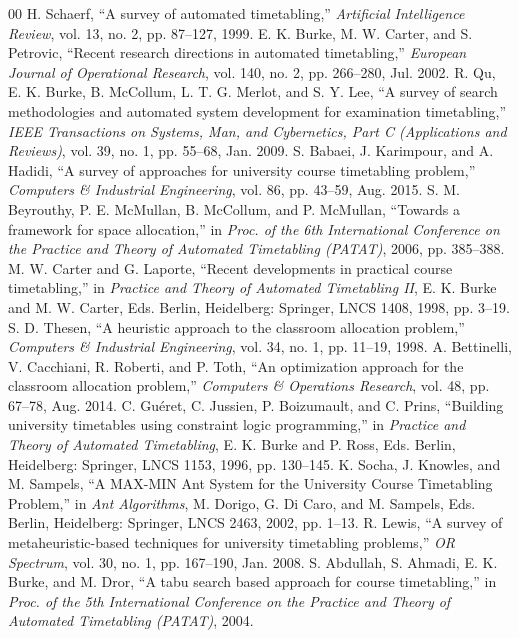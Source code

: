 \documentclass[conference]{IEEEtran}
\begin{document}
\begin{thebibliography}{00}
 H. Schaerf, ``A survey of automated timetabling,'' \textit{Artificial Intelligence Review}, vol. 13, no. 2, pp. 87--127, 1999.
 E. K. Burke, M. W. Carter, and S. Petrovic, ``Recent research directions in automated timetabling,'' \textit{European Journal of Operational Research}, vol. 140, no. 2, pp. 266--280, Jul. 2002.
 R. Qu, E. K. Burke, B. McCollum, L. T. G. Merlot, and S. Y. Lee, ``A survey of search methodologies and automated system development for examination timetabling,'' \textit{IEEE Transactions on Systems, Man, and Cybernetics, Part C (Applications and Reviews)}, vol. 39, no. 1, pp. 55--68, Jan. 2009.
 S. Babaei, J. Karimpour, and A. Hadidi, ``A survey of approaches for university course timetabling problem,'' \textit{Computers \& Industrial Engineering}, vol. 86, pp. 43--59, Aug. 2015.
 S. M. Beyrouthy, P. E. McMullan, B. McCollum, and P. McMullan, ``Towards a framework for space allocation,'' in \textit{Proc. of the 6th International Conference on the Practice and Theory of Automated Timetabling (PATAT)}, 2006, pp. 385--388.
 M. W. Carter and G. Laporte, ``Recent developments in practical course timetabling,'' in \textit{Practice and Theory of Automated Timetabling II}, E. K. Burke and M. W. Carter, Eds. Berlin, Heidelberg: Springer, LNCS 1408, 1998, pp. 3--19.
 S. D. Thesen, ``A heuristic approach to the classroom allocation problem,'' \textit{Computers \& Industrial Engineering}, vol. 34, no. 1, pp. 11--19, 1998.
 A. Bettinelli, V. Cacchiani, R. Roberti, and P. Toth, ``An optimization approach for the classroom allocation problem,'' \textit{Computers \& Operations Research}, vol. 48, pp. 67--78, Aug. 2014.
 C. Gu{\'e}ret, C. Jussien, P. Boizumault, and C. Prins, ``Building university timetables using constraint logic programming,'' in \textit{Practice and Theory of Automated Timetabling}, E. K. Burke and P. Ross, Eds. Berlin, Heidelberg: Springer, LNCS 1153, 1996, pp. 130--145.
 K. Socha, J. Knowles, and M. Sampels, ``A MAX-MIN Ant System for the University Course Timetabling Problem,'' in \textit{Ant Algorithms}, M. Dorigo, G. Di Caro, and M. Sampels, Eds. Berlin, Heidelberg: Springer, LNCS 2463, 2002, pp. 1--13.
 R. Lewis, ``A survey of metaheuristic-based techniques for university timetabling problems,'' \textit{OR Spectrum}, vol. 30, no. 1, pp. 167--190, Jan. 2008.
 S. Abdullah, S. Ahmadi, E. K. Burke, and M. Dror, ``A tabu search based approach for course timetabling,'' in \textit{Proc. of the 5th International Conference on the Practice and Theory of Automated Timetabling (PATAT)}, 2004.
\end{thebibliography}
\end{document}
